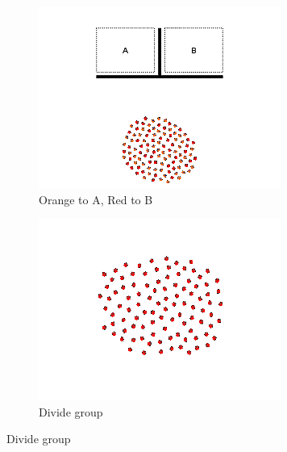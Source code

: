 \documentclass[]{article}
\begin{document}
\begin{figure}
\begin{subfigure}{0.42\textwidth}
		\includegraphics[width=\linewidth]{slide_images/Swarm_Robot_Control_-_100_Robot_0015.png}
		\caption{Orange to A, Red to B}
		\label{fig:sub1}
	\end{subfigure}%
	\begin{subfigure}{0.42\textwidth}
		\centering
		\includegraphics[width=\linewidth]{slide_images/Swarm_Robot_Control_-_100_Robot_0017.png}
		\caption{Divide group}
		\label{fig:sub2}
	\end{subfigure}
\end{figure}
\end{document}
